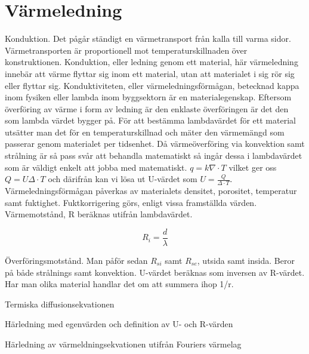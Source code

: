 \section{Värmeledning}
\label{sec:heatconduction}

Konduktion. Det pågår ständigt en värmetransport från kalla till varma sidor. Värmetransporten är proportionell mot temperaturskillnaden över konstruktionen. Konduktion, eller ledning genom ett material, här värmeledning innebär att värme flyttar sig inom ett material, utan att materialet i sig rör sig eller flyttar sig. Konduktiviteten, eller värmeledningsförmågan, betecknad kappa inom fysiken eller lambda inom byggsektorn är en materialegenskap. Eftersom överföring av värme i form av ledning är den enklaste överföringen är det den som lambda värdet bygger på. För att bestämma lambdavärdet för ett material utsätter man det för en temperaturskillnad och mäter den värmemängd som passerar genom materialet per tidsenhet. Då värmeöverföring via konvektion samt strålning är så pass svår att behandla matematiskt så ingår dessa i lambdavärdet som är väldigt enkelt att jobba med matematiskt. $q=k \nabla \cdot T$ vilket ger oss $Q=U \Delta \cdot T$ och därifrån kan vi lösa ut U-värdet som $U = \frac{Q}{\Delta\cdot T}$. Värmeledningsförmågan påverkas av materialets densitet, porositet, temperatur samt fuktighet. Fuktkorrigering görs, enligt vissa framställda värden. Värmemotstånd, R beräknas utifrån lambdavärdet.

\begin{equation}
R_i=\frac{d}{\lambda}
\end{equation}

Överföringsmotstånd. Man påför sedan $R_{si}$ samt $R_{se}$, utsida samt insida. Beror på både strålnings samt konvektion. U-värdet beräknas som inversen av R-värdet. Har man olika material handlar det om att summera ihop 1/r.

Termiska diffusionsekvationen

Härledning med egenvärden och definition av U- och R-värden

Härledning av värmeldningsekvationen utifrån Fouriers värmelag